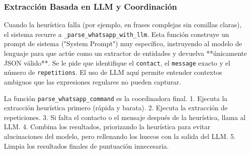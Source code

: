 \documentclass[letterpaper,12pt]{article}
\begin{document}
\subsubsection{Extracción Basada en LLM y Coordinación}

Cuando la heurística falla (por ejemplo, en frases complejas sin comillas claras), el sistema recurre a \texttt{\_parse\_whatsapp\_with\_llm}.
Esta función construye un prompt de sistema ("System Prompt") muy específico, instruyendo al modelo de lenguaje para que actúe como un extractor de entidades y devuelva **únicamente JSON válido**. Se le pide que identifique el \texttt{contact}, el \texttt{message} exacto y el número de \texttt{repetitions}. El uso de LLM aquí permite entender contextos ambiguos que las expresiones regulares no pueden capturar.

La función \texttt{parse\_whatsapp\_command} es la coordinadora final.
1. Ejecuta la extracción heurística primero (rápida y barata).
2. Ejecuta la extracción de repeticiones.
3. Si falta el contacto o el mensaje después de la heurística, llama al LLM.
4. Combina los resultados, priorizando la heurística para evitar alucinaciones del modelo, pero rellenando los huecos con la salida del LLM.
5. Limpia los resultados finales de puntuación innecesaria.
\end{document}
